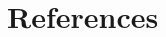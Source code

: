 \documentclass[
  letterpaper,
  11pt,
  english,
  singlespacing,
  headsepline]{MastersDoctoralThesis}
\newcommand{\chaptertopimage}{Chapter1/img/seagrasses.png}
\newcommand{\chapterbottomimage}{Chapter1/img/seagrasses.png}
\begin{document}
\begin{spacing}{1.5}
\end{spacing}

\renewcommand{\chaptertopimage}{Chapter2/img/ASD_psd.png}
\renewcommand{\chapterbottomimage}{Chapter2/img/Seagrass_quadrats_psd.png}

\newpage\null\thispagestyle{empty}\newpage


\chapter*{References}\label{references}


\begingroup
\raggedright

\label{refs}
\end{document}
